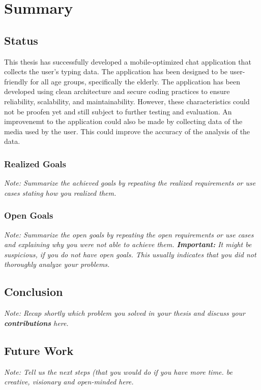 \chapter{Summary}


\section{Status}


This thesis has successfully developed a mobile-optimized chat application that collects the user's typing data.
The application has been designed to be user-friendly for all age groups, specifically the elderly.
The application has been developed using clean architecture and secure coding practices to ensure reliability, scalability, and maintainability.
However, these characteristics could not be proofen yet and still subject to further testing and evaluation.
An improvenemt to the application could also be made by collecting data of the media used by the user.
This could improve the accuracy of the analysis of the data. 


\subsection{Realized Goals}

\textit{Note: Summarize the achieved goals by repeating the realized requirements or use cases stating how you realized them.}

\subsection{Open Goals}

\textit{Note: Summarize the open goals by repeating the open requirements or use cases and explaining why you were not able to achieve them. \textbf{Important:} It might be suspicious, if you do not have open goals. This usually indicates that you did not thoroughly analyze your problems.}

\section{Conclusion}

\textit{Note: Recap shortly which problem you solved in your thesis and discuss your \textbf{contributions} here.}

\section{Future Work}

\textit{Note: Tell us the next steps  (that you would do if you have more time. be creative, visionary and open-minded here.}
